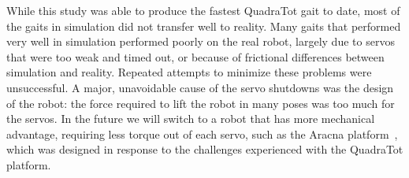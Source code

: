 While this study was able to produce the fastest QuadraTot gait to date, most of the gaits in simulation did not transfer well to reality. Many gaits that performed very well in simulation performed poorly on the real robot, largely due to servos that were too weak and timed out, or because of frictional differences between simulation and reality. Repeated attempts to minimize these problems were unsuccessful. 
A major, unavoidable cause of the servo shutdowns was the design of the robot: the force required to lift the robot in many poses was too much for the servos. In the future we will switch to a robot that has more mechanical advantage, requiring less torque out of each servo, such as the Aracna platform~\cite{lohmann2012aracna}, which was designed in response to the challenges experienced with the QuadraTot platform.  


%
%



